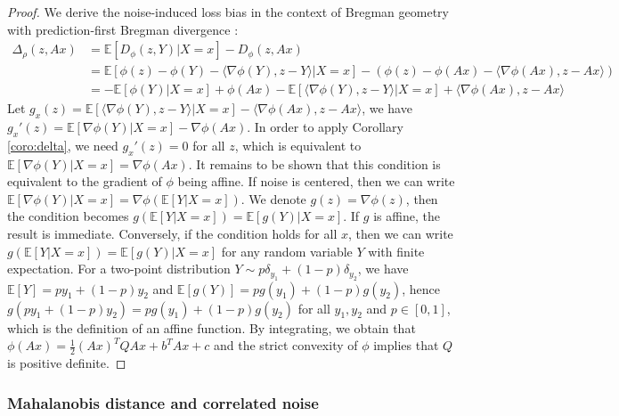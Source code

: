 \begin{proof}
We derive the noise-induced loss bias in the context of Bregman geometry with prediction-first Bregman divergence :
\begin{align*}
    \Delta_\rho(z, Ax) &= \mathbb{E}[D_\phi(z, Y) | X=x] - D_\phi(z, Ax) \\
    &= \mathbb{E}[\phi(z) - \phi(Y) - \langle \nabla \phi(Y), z - Y \rangle | X=x] - (\phi(z) - \phi(Ax) - \langle \nabla \phi(Ax), z - Ax \rangle) \\
    &= -\mathbb{E}[\phi(Y) | X=x] + \phi(Ax) - \mathbb{E}[\langle \nabla \phi(Y), z - Y \rangle | X=x] + \langle \nabla \phi(Ax), z - Ax \rangle
\end{align*}
Let $g_x(z) = \mathbb{E}[\langle \nabla \phi(Y), z - Y \rangle | X=x] - \langle \nabla \phi(Ax), z - Ax \rangle$, we have $g_x'(z) = \mathbb{E}[\nabla \phi(Y) | X=x] - \nabla \phi(Ax)$.
In order to apply Corollary \ref{coro:delta}, we need $g_x'(z) = 0$ for all $z$, which is equivalent to $\mathbb{E}[\nabla \phi(Y) | X=x] = \nabla \phi(Ax)$.
It remains to be shown that this condition is equivalent to the gradient of $\phi$ being affine.
If noise is centered, then we can write $\mathbb{E}[\nabla \phi(Y) | X=x] = \nabla \phi(\mathbb{E}[Y | X=x])$.
We denote $g(z) = \nabla \phi(z)$, then the condition becomes $g(\mathbb{E}[Y | X=x]) = \mathbb{E}[g(Y) | X=x]$.
If $g$ is affine, the result is immediate. Conversely, if the condition holds for all $x$, then we can write $g(\mathbb{E}[Y | X=x]) = \mathbb{E}[g(Y) | X=x]$ for any random variable $Y$ with finite expectation.
For a two-point distribution $Y \sim p \delta_{y_1} + (1-p) \delta_{y_2}$, we have $\mathbb{E}[Y] = p y_1 + (1-p) y_2$ and $\mathbb{E}[g(Y)] = p g(y_1) + (1-p) g(y_2)$, hence $g(p y_1 + (1-p) y_2) = p g(y_1) + (1-p) g(y_2)$ for all $y_1, y_2$ and $p \in [0, 1]$, which is the definition of an affine function.
By integrating, we obtain that $\phi(Ax) = \frac{1}{2} (Ax)^T Q Ax + b^T Ax + c$ and the strict convexity of $\phi$ implies that $Q$ is positive definite.
\end{proof}

\subsubsection{Mahalanobis distance and correlated noise}

